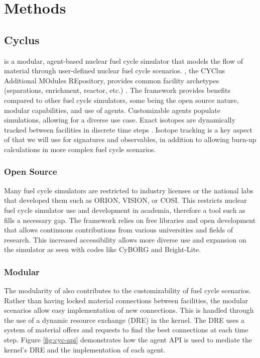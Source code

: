 \chapter[Methods]{Methods}
\section{Cyclus}

\Cyclus is a modular, agent-based nuclear fuel cycle simulator that models the flow of material through user-defined nuclear fuel cycle scenarios. \Cycamore, the CYClus 
Additional MOdules REpository, provides common facility archetypes (separations, enrichment, reactor, etc.) \cite{carlsen_cycamore_2014}. 
The \Cyclus framework provides benefits compared to other fuel cycle simulators, some being the open source nature, modular capabilities, and use of agents.
Customizable agents populate simulations, allowing for a diverse use case. Exact isotopes are dynamically tracked between facilities in discrete time steps \cite{huff_fundamental_2016}.
Isotope tracking is a key aspect of \Cyclus that we will use for signatures and observables, in addition to allowing burn-up calculations in more complex fuel cycle scenarios.

\subsection{Open Source}

Many fuel cycle simulators are restricted to industry licenses or the national labs that developed them such as ORION, VISION, or COSI. This restricts
nuclear fuel cycle simulator use and development in academia, therefore a tool such as \Cyclus fills a necessary gap. The \Cyclus framework relies on
free libraries and open development that allows continuous contributions from various universities and fields of research. This increased accessibility allows
more diverse use and expansion on the simulator as seen with codes like CyBORG and Bright-Lite.

\subsection{Modular}

The modularity of \Cyclus also contributes to the customizability of fuel cycle scenarios. Rather than having locked material connections between facilities, the modular
\Cyclus scenarios allow easy implementation of new connections. This is handled through the use of a dynamic resource exchange (DRE) in the \Cyclus kernel. The DRE 
uses a system of material offers and requests to find the best connections at each time step. Figure \ref{fig:cyc-api} demonstrates how the agent API is used to mediate
the \Cyclus kernel's DRE and the implementation of each agent.  

